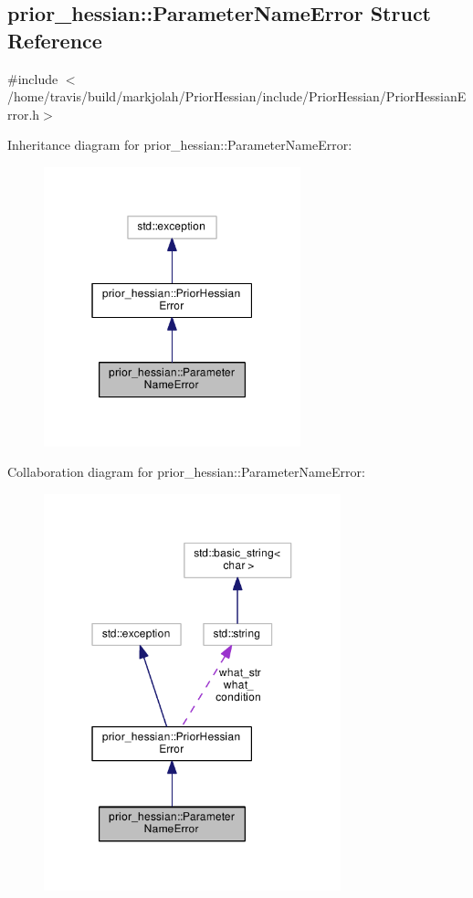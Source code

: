 \hypertarget{structprior__hessian_1_1ParameterNameError}{}\subsection{prior\+\_\+hessian\+:\+:Parameter\+Name\+Error Struct Reference}
\label{structprior__hessian_1_1ParameterNameError}


{\ttfamily \#include $<$/home/travis/build/markjolah/\+Prior\+Hessian/include/\+Prior\+Hessian/\+Prior\+Hessian\+Error.\+h$>$}



Inheritance diagram for prior\+\_\+hessian\+:\+:Parameter\+Name\+Error\+:\nopagebreak
\begin{figure}[H]
\begin{center}
\leavevmode
\includegraphics[width=211pt]{structprior__hessian_1_1ParameterNameError__inherit__graph}
\end{center}
\end{figure}


Collaboration diagram for prior\+\_\+hessian\+:\+:Parameter\+Name\+Error\+:\nopagebreak
\begin{figure}[H]
\begin{center}
\leavevmode
\includegraphics[width=244pt]{structprior__hessian_1_1ParameterNameError__coll__graph}
\end{center}
\end{figure}
